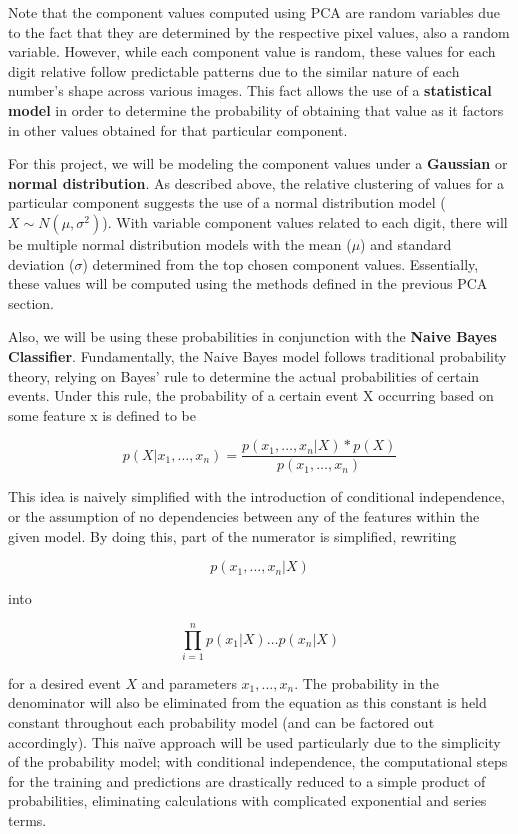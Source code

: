\documentclass[twocolumn]{article}
\begin{document}
Note that the component values computed using PCA are random variables due to the fact that they are determined by the respective pixel values, also a random variable. However, while each component value is random, these values for each digit relative follow predictable patterns due to the similar nature of each number's shape across various images. This fact allows the use of a \textbf{statistical model} in order to determine the probability of obtaining that value as it factors in other values obtained for that particular component. 

For this project, we will be modeling the component values under a \textbf{Gaussian} or \textbf{normal distribution}. As described above, the relative clustering of values for a particular component suggests the use of a normal distribution model ($X \sim N(\mu, \sigma^2)$). With variable component values related to each digit, there will be multiple normal distribution models with the mean ($\mu$) and standard deviation ($\sigma$) determined from the top chosen component values. Essentially, these values will be computed using the methods defined in the previous PCA section. 

Also, we will be using these probabilities in conjunction with the \textbf{Naive Bayes Classifier}. Fundamentally, the Naive Bayes model follows traditional probability theory, relying on Bayes' rule to determine the actual probabilities of certain events. Under this rule, the probability of a certain event X occurring based on some feature x is defined to be

$$p(X | x_1, \ldots, x_n) = \frac{p(x_1, \ldots, x_n | X) * p(X)}{p(x_1, \ldots, x_n)}$$

This idea is naively simplified with the introduction of conditional independence, or the assumption of no dependencies between any of the features within the given model. By doing this, part of the numerator is simplified, rewriting

$$p( x_1, \ldots, x_n | X) $$

into

$$\prod_{i=1}^{n}p(x_1 | X)\ldots p(x_n | X)$$

for a desired event $X$ and parameters $x_1,\ldots, x_n$. The probability in the denominator will also be eliminated from the equation as this constant is held constant throughout each probability model (and can be factored out accordingly). This naïve approach will be used particularly due to the simplicity of the probability model; with conditional independence, the computational steps for the training and predictions are drastically reduced to a simple product of probabilities, eliminating calculations with complicated exponential and series terms.
\end{document}
